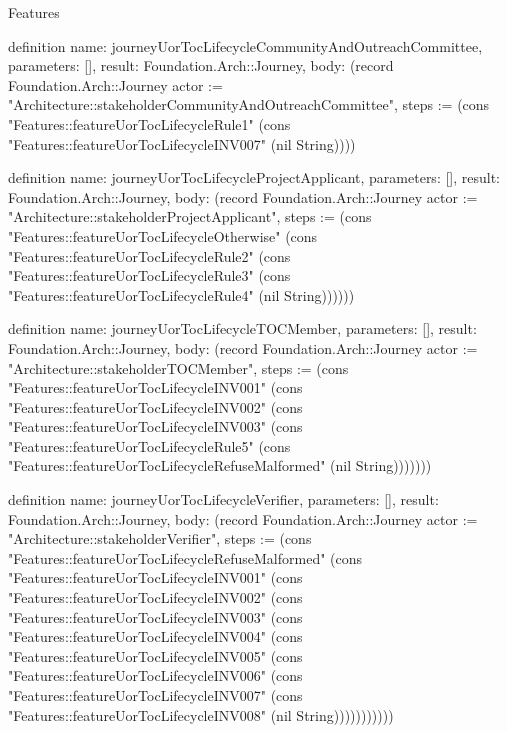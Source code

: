 \begin{lexlean}{Features}
\begin{semanticmodule}
definition{
  name: journeyUorTocLifecycleCommunityAndOutreachCommittee,
  parameters: [],
  result: Foundation.Arch::Journey,
  body: (record Foundation.Arch::Journey {actor := "Architecture::stakeholderCommunityAndOutreachCommittee", steps := (cons "Features::featureUorTocLifecycleRule1" (cons "Features::featureUorTocLifecycleINV007" (nil String)))})
}

definition{
  name: journeyUorTocLifecycleProjectApplicant,
  parameters: [],
  result: Foundation.Arch::Journey,
  body: (record Foundation.Arch::Journey {actor := "Architecture::stakeholderProjectApplicant", steps := (cons "Features::featureUorTocLifecycleOtherwise" (cons "Features::featureUorTocLifecycleRule2" (cons "Features::featureUorTocLifecycleRule3" (cons "Features::featureUorTocLifecycleRule4" (nil String)))))})
}

definition{
  name: journeyUorTocLifecycleTOCMember,
  parameters: [],
  result: Foundation.Arch::Journey,
  body: (record Foundation.Arch::Journey {actor := "Architecture::stakeholderTOCMember", steps := (cons "Features::featureUorTocLifecycleINV001" (cons "Features::featureUorTocLifecycleINV002" (cons "Features::featureUorTocLifecycleINV003" (cons "Features::featureUorTocLifecycleRule5" (cons "Features::featureUorTocLifecycleRefuseMalformed" (nil String))))))})
}

definition{
  name: journeyUorTocLifecycleVerifier,
  parameters: [],
  result: Foundation.Arch::Journey,
  body: (record Foundation.Arch::Journey {actor := "Architecture::stakeholderVerifier", steps := (cons "Features::featureUorTocLifecycleRefuseMalformed" (cons "Features::featureUorTocLifecycleINV001" (cons "Features::featureUorTocLifecycleINV002" (cons "Features::featureUorTocLifecycleINV003" (cons "Features::featureUorTocLifecycleINV004" (cons "Features::featureUorTocLifecycleINV005" (cons "Features::featureUorTocLifecycleINV006" (cons "Features::featureUorTocLifecycleINV007" (cons "Features::featureUorTocLifecycleINV008" (nil String))))))))))})
}
\end{semanticmodule}
\end{lexlean}
